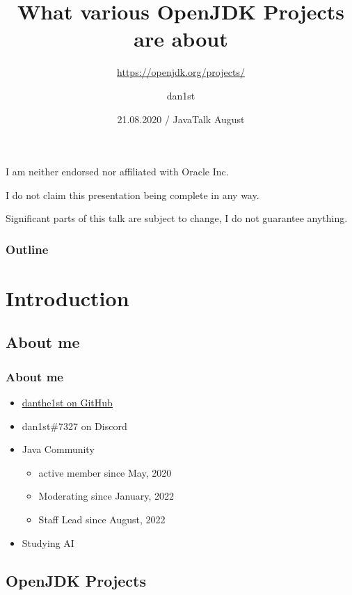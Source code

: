 \documentclass{beamer}
\title{What various OpenJDK Projects are about}
\subtitle{\href{https://openjdk.org/projects/}{https://openjdk.org/projects/}}
\author{dan1st}
\date{21.08.2020 / JavaTalk August}
\begin{document}
\begin{frame}
\frametitle{}
\titlepage
\end{frame}

\begin{frame}
I am neither endorsed nor affiliated with Oracle Inc.

I do not claim this presentation being complete in any way.

Significant parts of this talk are subject to change, I do not guarantee anything.
\end{frame}

\begin{frame}
\frametitle{Outline}
\tableofcontents
\end{frame}

\section{Introduction}

\subsection[About me]{About me}
\begin{frame}

\frametitle{About me}

\begin{itemize}
  \item \href{https://github.com/danthe1st}{danthe1st on GitHub}
  \item dan1st\#7327 on Discord
  \item Java Community
  \begin{itemize}
	  \item active member since May, 2020
	  \item Moderating since January, 2022
	  \item Staff Lead since August, 2022
	\end{itemize}
  \item Studying AI
\end{itemize}
\end{frame}

\subsection{OpenJDK Projects}
\end{document}
